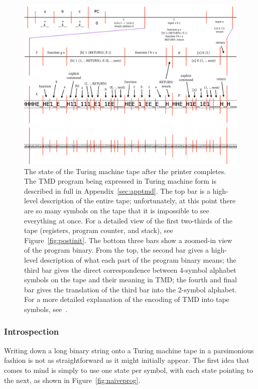 \documentclass[11pt]{article}
\begin{document}
\begin{figure}
\begin{center}
\includegraphics[scale=0.42]{figs/postprog.png}
\caption{The state of the Turing machine tape after the printer completes. The TMD program being expressed in Turing machine form is described in full in Appendix~\ref{sec:apptmd}. The top bar is a high-level description of the entire tape; unfortunately, at this point there are so many symbols on the tape that it is impossible to see everything at once. For a detailed view of the first two-thirds of the tape (registers, program counter, and stack), see Figure~\ref{fig:postinit}. The bottom three bars show a zoomed-in view of the program binary. From the top, the second bar gives a high-level description of what each part of the program binary means; the third bar gives the direct correspondence between 4-symbol alphabet symbols on the tape and their meaning in TMD; the fourth and final bar gives the translation of the third bar into the 2-symbol alphabet. For a more detailed explanation of the encoding of TMD into tape symbols, see~\cite{github}. \label{fig:postprog}}
\end{center}
\end{figure}

\subsubsection{Introspection}

Writing down a long binary string onto a Turing machine tape in a parsimonious fashion is not as straightforward as it might initially appear. The first idea that comes to mind is simply to use one state per symbol, with each state pointing to the next, as shown in Figure~\ref{fig:naiveprog}. 
\end{document}
